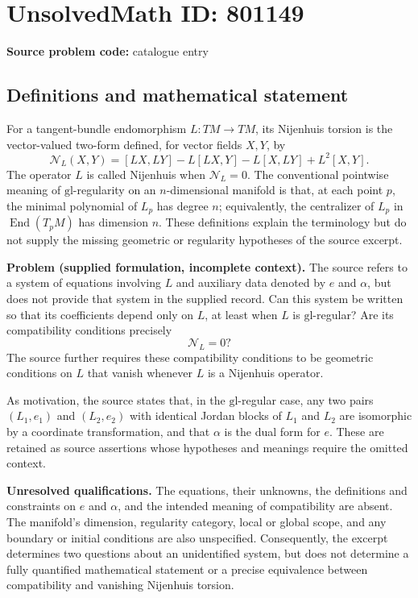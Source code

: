 \documentclass[11pt]{article}
\begin{document}
\section*{UnsolvedMath ID: 801149}
\textbf{Source problem code:} catalogue entry
\subsection{Definitions and mathematical statement}
For a tangent-bundle endomorphism \(L:TM\to TM\), its Nijenhuis torsion is the vector-valued two-form defined, for vector fields \(X,Y\), by
\[
\mathcal N_L(X,Y)=[LX,LY]-L[LX,Y]-L[X,LY]+L^2[X,Y].
\]
The operator \(L\) is called Nijenhuis when \(\mathcal N_L=0\). The conventional pointwise meaning of \(\mathrm{gl}\)-regularity on an \(n\)-dimensional manifold is that, at each point \(p\), the minimal polynomial of \(L_p\) has degree \(n\); equivalently, the centralizer of \(L_p\) in \(\operatorname{End}(T_pM)\) has dimension \(n\). These definitions explain the terminology but do not supply the missing geometric or regularity hypotheses of the source excerpt.

\textbf{Problem (supplied formulation, incomplete context).} The source refers to a system of equations involving \(L\) and auxiliary data denoted by \(e\) and \(\alpha\), but does not provide that system in the supplied record. Can this system be written so that its coefficients depend only on \(L\), at least when \(L\) is \(\mathrm{gl}\)-regular? Are its compatibility conditions precisely
\[
\mathcal N_L=0?
\]
The source further requires these compatibility conditions to be geometric conditions on \(L\) that vanish whenever \(L\) is a Nijenhuis operator.

As motivation, the source states that, in the \(\mathrm{gl}\)-regular case, any two pairs \((L_1,e_1)\) and \((L_2,e_2)\) with identical Jordan blocks of \(L_1\) and \(L_2\) are isomorphic by a coordinate transformation, and that \(\alpha\) is the dual form for \(e\). These are retained as source assertions whose hypotheses and meanings require the omitted context.

\textbf{Unresolved qualifications.} The equations, their unknowns, the definitions and constraints on \(e\) and \(\alpha\), and the intended meaning of compatibility are absent. The manifold's dimension, regularity category, local or global scope, and any boundary or initial conditions are also unspecified. Consequently, the excerpt determines two questions about an unidentified system, but does not determine a fully quantified mathematical statement or a precise equivalence between compatibility and vanishing Nijenhuis torsion.
\end{document}
